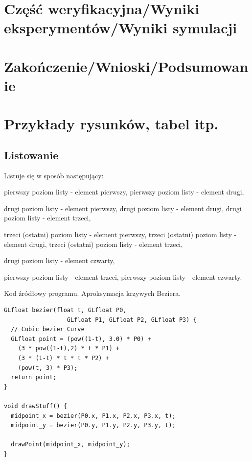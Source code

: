\newpage
\section[Część weryfikacyjna]{Część weryfikacyjna/Wyniki eksperymentów/Wyniki symulacji}

\section[Zakończenie]{Zakończenie/Wnioski/Podsumowanie}


\newpage
\section[Przykłady]{Przykłady rysunków, tabel itp.}
\subsection{Listowanie}
Listuje się w sposób następujący:
\begin{itemize}
	\itemi pierwszy poziom listy - element pierwszy,
	\itemi pierwszy poziom listy - element drugi,
	\begin{itemize}
		\itemii drugi poziom listy - element pierwszy,
		\itemii drugi poziom listy - element drugi,
		\itemii drugi poziom listy - element trzeci,
		\begin{itemize}
			\itemiii trzeci (ostatni) poziom listy - element pierwszy,
			\itemiii trzeci (ostatni) poziom listy - element drugi,
			\itemiii trzeci (ostatni) poziom listy - element trzeci,
		\end{itemize}
		\itemii drugi poziom listy - element czwarty,
		\end{itemize}
	\itemi pierwszy poziom listy - element trzeci,
	\itemi pierwszy poziom listy - element czwarty.
\end{itemize}

\begin{table}[H]
\caption{Kod źródłowy programu. Aproksymacja krzywych Beziera.}
\label{tab2}
\begin{lstlisting}[frame=single]
GLfloat bezier(float t, GLfloat P0,
                  GLfloat P1, GLfloat P2, GLfloat P3) {
  // Cubic bezier Curve
  GLfloat point = (pow((1-t), 3.0) * P0) +
    (3 * pow((1-t),2) * t * P1) +
    (3 * (1-t) * t * t * P2) +
    (pow(t, 3) * P3);
  return point;
}

void drawStuff() {
  midpoint_x = bezier(P0.x, P1.x, P2.x, P3.x, t);
  midpoint_y = bezier(P0.y, P1.y, P2.y, P3.y, t);

  drawPoint(midpoint_x, midpoint_y);
}
\end{lstlisting}
\end{table}

\newpage



